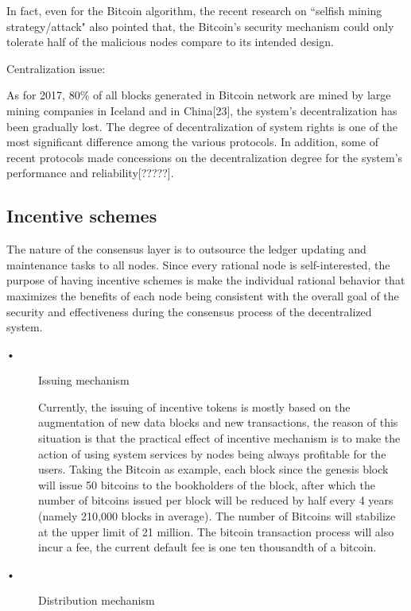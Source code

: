 \documentclass[doublespacing]{bmcart}
\begin{document}
\begin{CJK*}{UTF8}{gbsn}
\begin{description}
	In fact, even for the Bitcoin algorithm, the recent research on ``selfish mining strategy/attack" also pointed that, the Bitcoin’s security mechanism could only tolerate half of the malicious nodes compare to its intended design.

\item[•] Centralization issue:

 As for 2017, 80\% of all blocks generated in Bitcoin network are mined by large mining companies in Iceland and in China[23], the system’s decentralization has been gradually lost. The degree of decentralization of system rights is one of the most significant difference among the various protocols. In addition, some of recent protocols made concessions on the decentralization degree for the system’s performance and reliability[?????].
\end{description} 
 
\subsection{\textbf{Incentive schemes}}
The nature of the consensus layer is to outsource the ledger updating and maintenance tasks to all nodes. Since every rational node is self-interested, the purpose of having incentive schemes is make the individual rational behavior that maximizes the benefits of each node being consistent with the overall goal of the security and effectiveness during the consensus process of the decentralized system.
\begin{description}

\item[•] Issuing mechanism

Currently, the issuing of incentive tokens is mostly based on the augmentation of new data blocks and new transactions, the reason of this situation is that the  practical effect of incentive mechanism is to make the action of using system services by nodes being always profitable for the users.
 Taking the Bitcoin as example, each block since the genesis block will issue 50 bitcoins to the bookholders of the block, after which the number of bitcoins issued per block will be reduced by half every 4 years (namely 210,000 blocks in average). The number of Bitcoins will stabilize at the upper limit of 21 million. The bitcoin transaction process will also incur a fee, the current default fee is one ten thousandth of a bitcoin.

\item[•] Distribution mechanism


\end{description}
\end{CJK*}
\end{document}
